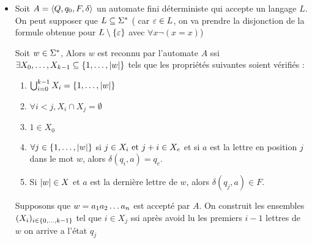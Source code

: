 \begin{proofI}
	\begin{itemize}
		\item \fbox{$\Leftarrow$}

		      Soit $A = \langle Q, q_0, F, \delta \rangle$ un automate fini déterministe qui accepte un langage $L$.  On peut supposer que $L \subseteq \Sigma^{*}$ (
		      car $\varepsilon \in L$, on va prendre la disjonction de la formule obtenue pour $L \setminus \left\{\varepsilon\right\}$ avec $\forall x \neg (x = x)$)

		      Soit $w \in \Sigma^{*}$, Alors $w$ est reconnu par l'automate $A$ ssi $\exists X_0,\ldots,X_{k-1} \subseteq \left\{1, \ldots , \left|w\right|\right\}$
		      tels que les propriétés suivantes soient vérifiés :
		      \begin{enumerate}
			      \item $\bigcup_{i=0}^{k - 1} X_i = \left\{1, \ldots, \left|w\right|\right\}$
			      \item $\forall i < j, X_i \cap X_j = \emptyset$
			      \item $1 \in X_0$
			      \item $\forall j \in \left\{1, \ldots, \left|w\right|\right\}$ si $j \in X_i \text{ et } j+i \in X_e$ et si $a$ est la lettre en position $j$ dans le mot
			            $w$, alors $\delta (q_i,a) = q_e$.

			      \item Si $\left|w\right| \in X$ et $a$ est la dernière lettre de $w$, alors $\delta (q_j,a) \in F$.
		      \end{enumerate}

		      Supposons que $w = a_1 a_2 \ldots a_{n}$ est accepté par $A$. On construit les ensembles $(X_i)_{i \in \left\{0,\ldots,k-1\right\}}$
		      tel que $i \in X_j$ ssi après avoid lu les premiers $i-1$ lettres de $w$ on arrive a l'état $q_j$


\end{itemize}
\end{proofI}
